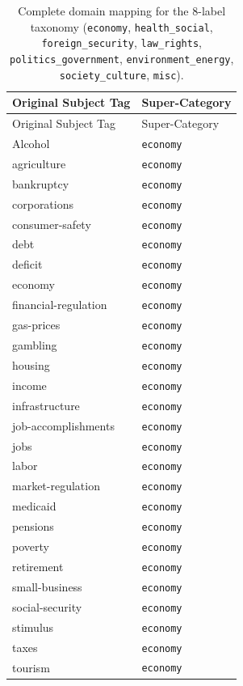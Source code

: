 \begin{longtable}{ll}
\caption[Complete domain mapping for the 8-label taxonomy]{Complete domain mapping for the 8-label taxonomy (\texttt{economy}, \texttt{health\_social}, \texttt{foreign\_security}, 
\texttt{law\_rights}, \texttt{politics\_government}, \texttt{environment\_energy}, \texttt{society\_culture}, \texttt{misc}).}
\label{tab:domain_mapping_8}\\
\toprule
Original Subject Tag & Super-Category \\
\midrule
\endfirsthead
\toprule
Original Subject Tag & Super-Category \\
\midrule
\endhead
\bottomrule
\endfoot
Alcohol & \texttt{economy} \\
agriculture & \texttt{economy} \\
bankruptcy & \texttt{economy} \\
corporations & \texttt{economy} \\
consumer-safety & \texttt{economy} \\
debt & \texttt{economy} \\
deficit & \texttt{economy} \\
economy & \texttt{economy} \\
financial-regulation & \texttt{economy} \\
gas-prices & \texttt{economy} \\
gambling & \texttt{economy} \\
housing & \texttt{economy} \\
income & \texttt{economy} \\
infrastructure & \texttt{economy} \\
job-accomplishments & \texttt{economy} \\
jobs & \texttt{economy} \\
labor & \texttt{economy} \\
market-regulation & \texttt{economy} \\
medicaid & \texttt{economy} \\
pensions & \texttt{economy} \\
poverty & \texttt{economy} \\
retirement & \texttt{economy} \\
small-business & \texttt{economy} \\
social-security & \texttt{economy} \\
stimulus & \texttt{economy} \\
taxes & \texttt{economy} \\
tourism & \texttt{economy} \\

\end{longtable}
